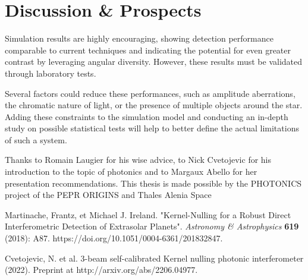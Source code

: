 \documentclass[]{spie}  %
\begin{document}
\section{Discussion \& Prospects}

Simulation results are highly encouraging, showing detection performance comparable to current techniques and indicating the potential for even greater contrast by leveraging angular diversity. However, these results must be validated through laboratory tests.

Several factors could reduce these performances, such as amplitude aberrations, the chromatic nature of light, or the presence of multiple objects around the star. Adding these constraints to the simulation model and conducting an in-depth study on possible statistical tests will help to better define the actual limitations of such a system.

\acknowledgments

Thanks to Romain Laugier for his wise advice, to Nick Cvetojevic for his introduction to the topic of photonics and to Margaux Abello for her presentation recommendations. This thesis is made possible by the PHOTONICS project of the PEPR ORIGINS and Thales Alenia Space



\begin{thebibliography}{60}

      Martinache, Frantz, et Michael J. Ireland. "Kernel-Nulling for a Robust Direct Interferometric Detection of Extrasolar Planets". {\it Astronomy \& Astrophysics} \textbf{619} (2018): A87. https://doi.org/10.1051/0004-6361/201832847.
    
    
     Cvetojevic, N. et al. 3-beam self-calibrated Kernel nulling photonic interferometer (2022). Preprint at http://arxiv.org/abs/2206.04977.
    
\end{thebibliography}

\end{document}
